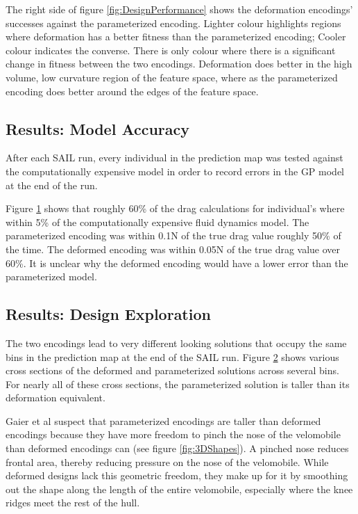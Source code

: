 \documentclass{sig-alternate}
\begin{document}
The right side of figure \ref{fig:DesignPerformance} shows the deformation encodings' successes against the parameterized encoding.
Lighter colour highlights regions where deformation has a better fitness than the parameterized encoding;
Cooler colour indicates the converse.
There is only colour where there is a significant change in fitness between the two encodings.
Deformation does better in the high volume, low curvature region of the feature space, where as the parameterized encoding does better around the edges of the feature space.

\subsection{Results: Model Accuracy}
After each SAIL run, every individual in the prediction map was tested against the computationally expensive model in order to record errors in the GP model at the end of the run.

\begin{figure}[htb]
\centering
{}
\label{fig:ModelAccuracy}
\caption{}
\end{figure}

Figure \ref{fig:ModelAccuracy} shows that roughly 60\% of the drag calculations for individual's where within 5\% of the computationally expensive fluid dynamics model.
The parameterized encoding was within 0.1N of the true drag value roughly 50\% of the time.
The deformed encoding was within 0.05N of the true drag value over 60\%.
It is unclear why the deformed encoding would have a lower error than the parameterized model.

\subsection{Results: Design Exploration}
The two encodings lead to very different looking solutions that occupy the same bins in the prediction map at the end of the SAIL run.
Figure \ref{fig:CrossSections} shows various cross sections of the deformed and parameterized solutions across several bins.
For nearly all of these cross sections, the parameterized solution is taller than its deformation equivalent. 

\begin{figure}[htb]
\centering
{}
\label{fig:CrossSections}
\caption{}
\end{figure}

Gaier et al suspect that parameterized encodings are taller than deformed encodings because they have more freedom to pinch the nose of the velomobile than deformed encodings can (see figure \ref{fig:3DShapes}).
A pinched nose reduces frontal area, thereby reducing pressure on the nose of the velomobile.
While deformed designs lack this geometric freedom, they make up for it by smoothing out the shape along the length of the entire velomobile, especially where the knee ridges meet the rest of the hull.
\end{document}
